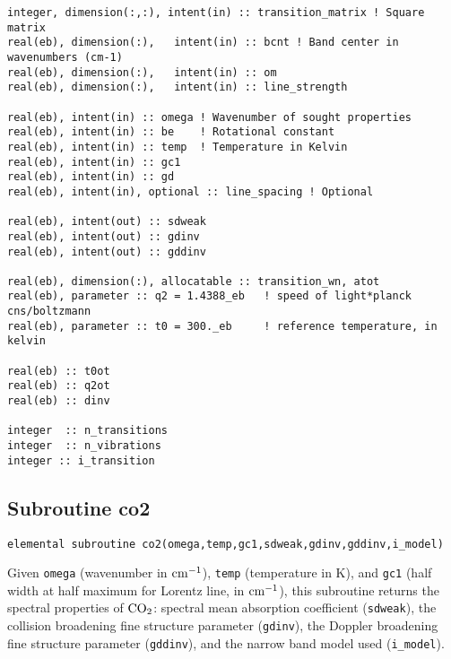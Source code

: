 \begin{lstlisting}
integer, dimension(:,:), intent(in) :: transition_matrix ! Square matrix
real(eb), dimension(:),   intent(in) :: bcnt ! Band center in wavenumbers (cm-1)
real(eb), dimension(:),   intent(in) :: om
real(eb), dimension(:),   intent(in) :: line_strength

real(eb), intent(in) :: omega ! Wavenumber of sought properties
real(eb), intent(in) :: be    ! Rotational constant
real(eb), intent(in) :: temp  ! Temperature in Kelvin
real(eb), intent(in) :: gc1
real(eb), intent(in) :: gd
real(eb), intent(in), optional :: line_spacing ! Optional

real(eb), intent(out) :: sdweak
real(eb), intent(out) :: gdinv
real(eb), intent(out) :: gddinv

real(eb), dimension(:), allocatable :: transition_wn, atot
real(eb), parameter :: q2 = 1.4388_eb   ! speed of light*planck cns/boltzmann
real(eb), parameter :: t0 = 300._eb     ! reference temperature, in kelvin

real(eb) :: t0ot
real(eb) :: q2ot
real(eb) :: dinv

integer  :: n_transitions
integer  :: n_vibrations
integer :: i_transition
\end{lstlisting}

\subsection{Subroutine co2}

\begin{lstlisting}
elemental subroutine co2(omega,temp,gc1,sdweak,gdinv,gddinv,i_model)
\end{lstlisting}
Given \verb=omega= (wavenumber in $\rm cm^{-1}$), \verb=temp= (temperature in K), and \verb=gc1= (half width at half maximum for Lorentz line, in $\rm cm^{-1}$), this subroutine returns the spectral properties of $\rm CO_2$: spectral mean absorption coefficient (\verb=sdweak=), the collision broadening fine structure parameter (\verb=gdinv=), the Doppler broadening fine structure parameter (\verb=gddinv=), and the narrow band model used (\verb=i_model=).

